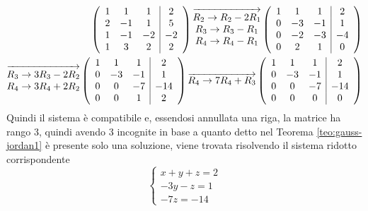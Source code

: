 \begin{eqnarray*}
  \left(
  \begin{array}[ht!]{ccc|c}
    1 & 1 & 1 & 2\\
    2 & -1 & 1 & 5\\
    1 & -1 & -2 & -2\\
    1 & 3 & 2 & 2
  \end{array}\right)
  \overrightarrow{
  \begin{matrix}
    R_2\to R_2-2R_1\\
    R_3\to R_3-R_1\\
    R_4\to R_4-R_1
  \end{matrix}
  }\left(
  \begin{array}[ht!]{ccc|c}
    1 & 1 & 1 & 2\\
    0 & -3 & -1 & 1\\
    0 & -2 & -3 & -4\\
    0 & 2 & 1 & 0
  \end{array}\right)\\ \overrightarrow{
  \begin{matrix}
    R_3\to 3R_3-2R_2\\
    R_4\to 3R_4+2R_2
  \end{matrix}
  }\left(
  \begin{array}[ht!]{ccc|c}
    1 & 1 & 1 & 2\\
    0 & -3 & -1 & 1\\
    0 & 0 & -7 & -14\\
    0 & 0 & 1 & 2
  \end{array}\right)\overrightarrow{R_4\to7R_4+R_3}
  \left(
  \begin{array}[ht!]{ccc|c}
    1 & 1 & 1 & 2\\
    0 & -3 & -1 & 1\\
    0 & 0 & -7 & -14\\
    0 & 0 & 0 & 0
  \end{array}
  \right)
\end{eqnarray*}
Quindi il sistema è compatibile e, essendosi annullata una riga, la matrice
ha rango 3, quindi avendo 3 incognite in base a quanto detto nel Teorema \ref{teo:gauss-jordan1}
è presente solo una soluzione, viene trovata risolvendo il sistema ridotto corrispondente
\begin{equation*}
  \begin{cases}
    x+y+z=2\\
    -3y-z=1\\
    -7z=-14
  \end{cases}
\end{equation*}
